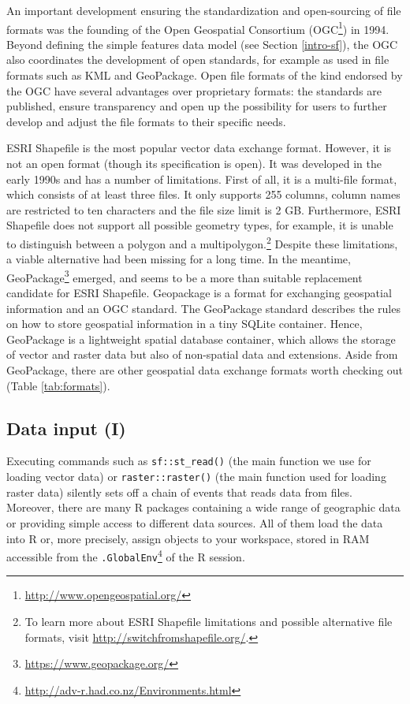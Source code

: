 \documentclass[]{krantz}
\let\rmarkdownfootnote\footnote%
\def\footnote{\protect\rmarkdownfootnote}
\renewcommand{\href}[2]{#2\footnote{\url{#1}}}
\begin{document}
An important development ensuring the standardization and open-sourcing of file formats was the founding of the Open Geospatial Consortium (\href{http://www.opengeospatial.org/}{OGC}) in 1994.
Beyond defining the simple features data model (see Section \ref{intro-sf}), the OGC also coordinates the development of open standards, for example as used in file formats such as KML and GeoPackage.
Open file formats of the kind endorsed by the OGC have several advantages over proprietary formats: the standards are published, ensure transparency and open up the possibility for users to further develop and adjust the file formats to their specific needs.

ESRI Shapefile is the most popular vector data exchange format.
However, it is not an open format (though its specification is open).
It was developed in the early 1990s and has a number of limitations.
First of all, it is a multi-file format, which consists of at least three files.
It only supports 255 columns, column names are restricted to ten characters and the file size limit is 2 GB.
Furthermore, ESRI Shapefile does not support all possible geometry types, for example, it is unable to distinguish between a polygon and a multipolygon.\footnote{To learn more about ESRI Shapefile limitations and possible alternative file formats, visit \url{http://switchfromshapefile.org/}.}
Despite these limitations, a viable alternative had been missing for a long time.
In the meantime, \href{https://www.geopackage.org/}{GeoPackage} emerged, and seems to be a more than suitable replacement candidate for ESRI Shapefile.
Geopackage is a format for exchanging geospatial information and an OGC standard.
The GeoPackage standard describes the rules on how to store geospatial information in a tiny SQLite container.
Hence, GeoPackage is a lightweight spatial database container, which allows the storage of vector and raster data but also of non-spatial data and extensions.
Aside from GeoPackage, there are other geospatial data exchange formats worth checking out (Table \ref{tab:formats}).

\hypertarget{data-input}{%
\subsection{Data input (I)}\label{data-input}}

Executing commands such as \texttt{sf::st\_read()} (the main function we use for loading vector data) or \texttt{raster::raster()} (the main function used for loading raster data) silently sets off a chain of events that reads data from files.
Moreover, there are many R packages containing a wide range of geographic data or providing simple access to different data sources.
All of them load the data into R or, more precisely, assign objects to your workspace, stored in RAM accessible from the \href{http://adv-r.had.co.nz/Environments.html}{\texttt{.GlobalEnv}} of the R session.
\end{document}
